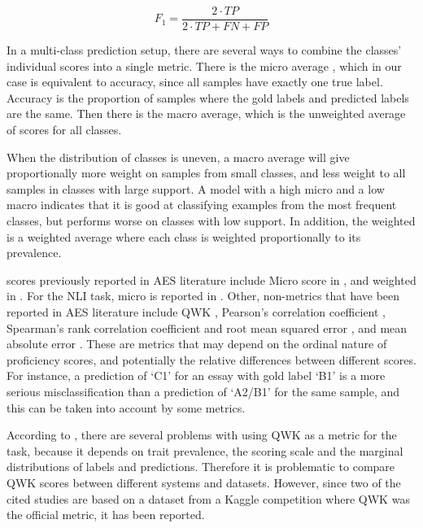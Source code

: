 \begin{equation}\label{eq:fi}
  F_1 = {\frac{2\cdot TP}{2\cdot TP + FN + FP}}
\end{equation}

In a multi-class prediction setup, there are several ways to combine the
classes' individual \FI scores into a single metric. There is the micro
average \FI, which in our case is equivalent to accuracy, since all samples
have exactly one true label. Accuracy is the proportion of samples where the
gold labels and predicted labels are the same. Then there is the macro
average, which is the unweighted average of \FI scores for all classes.

When the distribution of classes is uneven, a macro average will give
proportionally more weight on samples from small classes, and less weight to
all samples in classes with large support. A model with a high micro \FI and
a low macro \FI indicates that it is good at classifying examples from the
most frequent classes, but performs worse on classes with low support. In
addition, the weighted \FI is a weighted average where each class is weighted
proportionally to its prevalence.

\FI scores previously reported in \ac{AES} literature include Micro \FI score
in \textcite{vajjala17}, and weighted \FI in
\textcite{vajjala18universalCEFR}. For the \ac{NLI} task, micro \FI is
reported in \textcite{malmasi15,malmasi17}. Other, non-\FI metrics that have
been reported in \ac{AES} literature include \ac{QWK} \autocite{taghipour16,
alikaniotis2016automatic}, Pearson's correlation coefficient
\autocite{vajjala17, alikaniotis2016automatic}, Spearman's rank correlation
coefficient and root mean squared error \autocite{alikaniotis2016automatic},
and mean absolute error \autocite{vajjala17}. These are metrics that may
depend on the ordinal nature of proficiency scores, and potentially the
relative differences between different scores. For instance, a prediction of
`C1' for an essay with gold label `B1' is a more serious misclassification
than a prediction of `A2/B1' for the same sample, and this can be taken into
account by some metrics.

According to \textcite{yannakoudakis2015evaluating}, there are several
problems with using \ac{QWK} as a metric for the task, because it depends on
trait prevalence, the scoring scale and the marginal distributions of labels
and predictions. Therefore it is problematic to compare \ac{QWK} scores
between different systems and datasets. However, since two of the cited
studies are based on a dataset from a Kaggle competition where \ac{QWK} was
the official metric, it has been reported.


